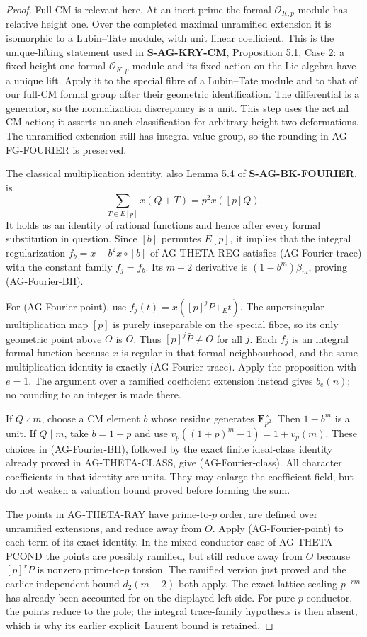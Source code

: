 \documentclass[11pt,a4paper]{article}
\begin{document}
\begin{proof}
Full CM is relevant here.  At an inert prime the formal
$\mathcal O_{K,p}$-module has relative height one.  Over the completed
maximal unramified extension it is isomorphic to a Lubin--Tate module,
with unit linear coefficient.  This is the unique-lifting statement
used in \textbf{S-AG-KRY-CM}, Proposition 5.1, Case 2: a fixed
height-one formal $\mathcal O_{K,p}$-module and its fixed action on the
Lie algebra have a unique lift.  Apply it to the special fibre of a
Lubin--Tate module and to that of our full-CM formal group after their
geometric identification.  The differential is a generator, so the
normalization discrepancy is a unit.  This step uses the actual CM
action; it asserts no such classification for arbitrary height-two
deformations.  The unramified extension still has integral value group,
so the rounding in AG-FG-FOURIER is preserved.

The classical multiplication identity, also Lemma 5.4 of
\textbf{S-AG-BK-FOURIER}, is
\[
          \sum_{T\in E[p]}x(Q+T)=p^2x([p]Q).
\]
It holds as an identity of rational functions and hence after every
formal substitution in question.  Since $[b]$ permutes $E[p]$, it
implies that the integral regularization
$f_b=x-b^2x\circ[b]$ of AG-THETA-REG satisfies
(AG-Fourier-trace) with the constant family $f_j=f_b$.
Its $m-2$ derivative is $(1-b^m)\beta_m$, proving
(AG-Fourier-BH).

For (AG-Fourier-point), use
$f_j(t)=x([p]^jP+_E t)$.  The supersingular multiplication map $[p]$
is purely inseparable on the special fibre, so its only geometric
point above $O$ is $O$.  Thus $[p]^j\bar P\ne O$ for all $j$.
Each $f_j$ is an integral formal function because $x$ is regular in
that formal neighbourhood, and the same multiplication identity is
exactly (AG-Fourier-trace).  Apply the proposition with $e=1$.
The argument over a ramified coefficient extension instead gives
$b_e(n)$; no rounding to an integer is made there.

If $Q\nmid m$, choose a CM element $b$ whose residue generates
$\mathbf F_{p^2}^{\times}$.  Then $1-b^m$ is a unit.  If $Q\mid m$,
take $b=1+p$ and use
$v_p((1+p)^m-1)=1+v_p(m)$.  These choices in (AG-Fourier-BH),
followed by the exact finite ideal-class identity already proved in
AG-THETA-CLASS, give (AG-Fourier-class).  All character coefficients
in that identity are units.  They may enlarge the coefficient field,
but do not weaken a valuation bound proved before forming the sum.

The points in AG-THETA-RAY have prime-to-$p$ order, are defined over
unramified extensions, and reduce away from $O$.  Apply
(AG-Fourier-point) to each term of its exact identity.  In the mixed
conductor case of AG-THETA-PCOND the points are possibly ramified,
but still reduce away from $O$ because $[p]^rP$ is nonzero
prime-to-$p$ torsion.  The ramified version just proved and the earlier
independent bound $d_2(m-2)$ both apply.  The exact lattice scaling
$p^{-rm}$ has already been accounted for on the displayed left side.
For pure $p$-conductor, the points reduce to the pole; the integral
trace-family hypothesis is then absent, which is why its earlier
explicit Laurent bound is retained.
\end{proof}
\end{document}
